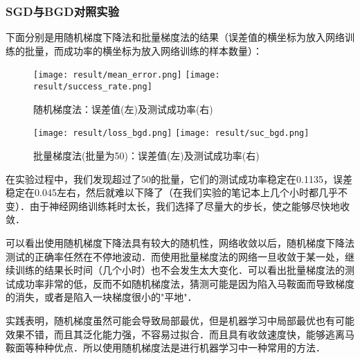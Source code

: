 \documentclass{article}
\begin{document}
  \subsubsection{SGD与BGD对照实验}
  下面分别是用随机梯度下降法和批量梯度法的结果（误差值的横坐标为放入网络训练的批量，而成功率的横坐标为放入网络训练的样本数量）：
  \begin{figure}
    \centering
    \texttt{[image: result/mean\_error.png]}
    \texttt{[image: result/success\_rate.png]}
    \caption{随机梯度法：误差值(左)及测试成功率(右)}
  \end{figure}
  \begin{figure}
    \centering
    \texttt{[image: result/loss\_bgd.png]}
    \texttt{[image: result/suc\_bgd.png]}
    \caption{批量梯度法(批量为50)：误差值(左)及测试成功率(右)}
  \end{figure}
  \restoregeometry

  在实验过程中，我们发现超过了50的批量，它们的测试成功率稳定在0.1135，误差稳定在0.045左右，然后就难以下降了（在我们实验的笔记本上几个小时都几乎不变）．由于神经网络训练耗时太长，我们选择了尽量大的步长，使之能够尽快地收敛．

  可以看出使用随机梯度下降法具有较大的随机性，网络收敛以后，随机梯度下降法测试的正确率任然在不停地波动．而使用批量梯度法的网络一旦收敛于某一处，继续训练的结果长时间（几个小时）也不会发生太大变化．可以看出批量梯度法的测试成功率非常的低，反而不如随机梯度法，猜测可能是因为陷入马鞍面而导致梯度的消失，或者是陷入一块梯度很小的"平地"．

  实践表明，随机梯度虽然可能会导致局部最优，但是机器学习中局部最优也有可能效果不错，而且其泛化能力强，不容易过拟合．而且具有收敛速度快，能够逃离马鞍面等种种优点．所以使用随机梯度法是进行机器学习中一种常用的方法．
\end{document}
